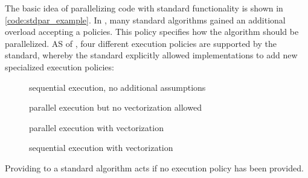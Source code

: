 The basic idea of parallelizing code with \cpp standard functionality is shown in \autoref{code:stdpar_example}. 
In , many standard algorithms gained an additional overload accepting a  policies. 
This policy specifies how the algorithm should be parallelized. 
AS of , four different execution policies are supported by the standard, whereby the \cpp standard explicitly allowed implementations to add new specialized execution policies:
\begin{description}
    \item[] sequential execution, no additional assumptions
    \item[] parallel execution but no vectorization allowed
    \item[] parallel execution with vectorization
    \item[] sequential execution with vectorization
\end{description}
Providing  to a \cpp standard algorithm acts if no execution policy has been provided. 


